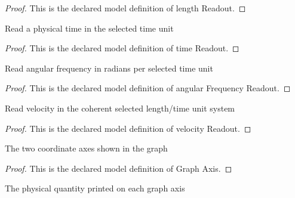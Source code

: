 \begin{proof}
  This is the declared model definition of length Readout.
\end{proof}
\begin{definition}
  \label{def:physics:phyx-mini-0251:phyxminiproblems-problemphyxmini0251-timereadout}
  Read a physical time in the selected time unit
\end{definition}
\begin{proof}
  This is the declared model definition of time Readout.
\end{proof}
\begin{definition}
  \label{def:physics:phyx-mini-0251:phyxminiproblems-problemphyxmini0251-angularfrequencyreadout}
  Read angular frequency in radians per selected time unit
\end{definition}
\begin{proof}
  This is the declared model definition of angular Frequency Readout.
\end{proof}
\begin{definition}
  \label{def:physics:phyx-mini-0251:phyxminiproblems-problemphyxmini0251-velocityreadout}
  Read velocity in the coherent selected length/time unit system
\end{definition}
\begin{proof}
  This is the declared model definition of velocity Readout.
\end{proof}
\begin{definition}
  \label{def:physics:phyx-mini-0251:phyxminiproblems-problemphyxmini0251-graphaxis}
  The two coordinate axes shown in the graph
\end{definition}
\begin{proof}
  This is the declared model definition of Graph Axis.
\end{proof}
\begin{definition}
  \label{def:physics:phyx-mini-0251:phyxminiproblems-problemphyxmini0251-axisquantity}
  The physical quantity printed on each graph axis
\end{definition}
